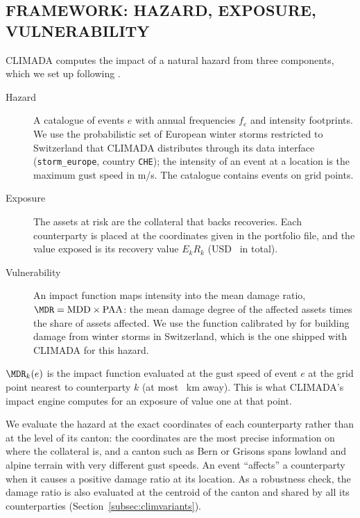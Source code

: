 \subsection{FRAMEWORK: HAZARD, EXPOSURE, VULNERABILITY}
CLIMADA \citep{AznarSiguan19} computes the impact of a natural hazard from three components, which we set up following \citet{HauserEtAl26}.
\begin{description}
\item[Hazard] A catalogue of events $e$ with annual frequencies $f_e$ and intensity footprints. We use the probabilistic set of European winter storms restricted to Switzerland that CLIMADA distributes through its data interface (\texttt{storm\_europe}, country \texttt{CHE}); the intensity of an event at a location is the maximum gust speed in m/s. The catalogue contains  events on  grid points.
\item[Exposure] The assets at risk are the collateral that backs recoveries. Each counterparty is placed at the coordinates given in the portfolio file, and the value exposed is its recovery value $E_kR_k$ (USD~ in total).
\item[Vulnerability] An impact function maps intensity into the mean damage ratio, $\MDR=\mathrm{MDD}\times\mathrm{PAA}$: the mean damage degree of the affected assets times the share of assets affected. We use the function calibrated by \citet{Welker21} for building damage from winter storms in Switzerland, which is the one shipped with CLIMADA for this hazard.
\end{description}
$\MDR_k(e)$ is the impact function evaluated at the gust speed of event $e$ at the grid point nearest to counterparty $k$ (at most ~km away). This is what CLIMADA's impact engine computes for an exposure of value one at that point.

We evaluate the hazard at the exact coordinates of each counterparty rather than at the level of its canton: the coordinates are the most precise information on where the collateral is, and a canton such as Bern or Grisons spans lowland and alpine terrain with very different gust speeds. An event ``affects'' a counterparty when it causes a positive damage ratio at its location. As a robustness check, the damage ratio is also evaluated at the centroid of the canton and shared by all its counterparties (Section~\ref{subsec:climvariants}).

